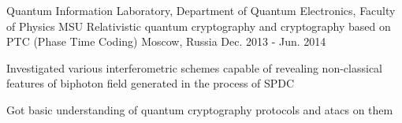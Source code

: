 \begin{cventries}
	\cventry
		{
			Quantum Information Laboratory, Department of Quantum Electronics, Faculty of Physics MSU
		}
		{
			Relativistic quantum cryptography and cryptography based on PTC (Phase Time Coding)
		}
		{Moscow, Russia}
		{Dec. 2013 - Jun. 2014}
		{
			\begin{cvitems}
				\item {Investigated various interferometric schemes capable of revealing non-classical features of biphoton field generated in the process of SPDC}
				\item {Got basic understanding of quantum cryptography protocols and atacs on them}
			\end{cvitems}
		}
		
\end{cventries}
